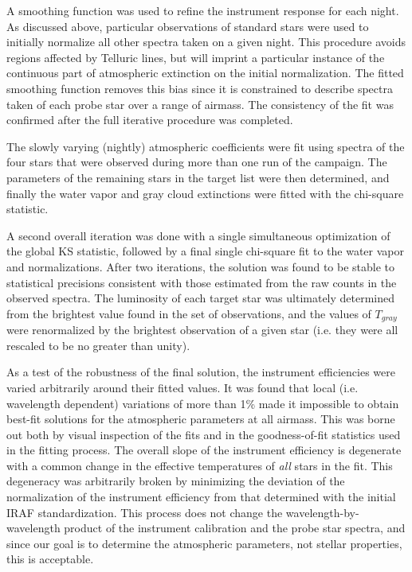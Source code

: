 \documentclass[manuscript]{aastex}
\begin{document}
A smoothing function was used to refine the instrument response for each night.
As discussed above, particular observations of standard stars were used to initially normalize all other spectra taken on a given night.
This procedure avoids regions affected by Telluric lines, but will imprint a particular instance of the
continuous part of atmospheric extinction on the initial normalization.
The fitted smoothing function removes this bias since it is constrained to describe spectra taken of each probe star over a range of airmass.
The consistency of the fit was confirmed after the full iterative procedure was completed. 

The slowly varying (nightly) atmospheric coefficients were fit using spectra of the four stars that
were observed during more than one run of the campaign.
The parameters of the remaining stars in the target list were then determined, 
and finally the water vapor and gray cloud extinctions were fitted with the chi-square statistic.

A second overall iteration was done with a single simultaneous optimization of the global KS statistic,
followed by a final single chi-square fit to the water vapor and normalizations.
After two iterations, the solution was found to be stable to statistical precisions consistent with those
estimated from the raw counts in the observed spectra.
The luminosity of each target star was ultimately determined from the brightest value found in the set of observations, 
and the values of $T_{gray}$ were renormalized by the brightest observation of a given star (i.e. they were all rescaled to be no greater than unity).

As a test of the robustness of the final solution, the instrument efficiencies were varied arbitrarily around their fitted values.
It was found that local (i.e. wavelength dependent) variations of more than 1\% made it impossible to obtain best-fit solutions
for the atmospheric parameters at all airmass.
This was borne out both by visual inspection of the fits and in the goodness-of-fit statistics used in the fitting process.
The overall slope of the instrument efficiency is degenerate with a common change in the effective temperatures of {\it all} stars in the fit.
This degeneracy was arbitrarily broken by minimizing the deviation of the normalization of the instrument efficiency
from that determined with the initial IRAF standardization.
This process does not change the wavelength-by-wavelength product of the instrument calibration and the probe star spectra,
and since our goal is to determine the atmospheric parameters, not stellar properties, this is acceptable.
\end{document}
